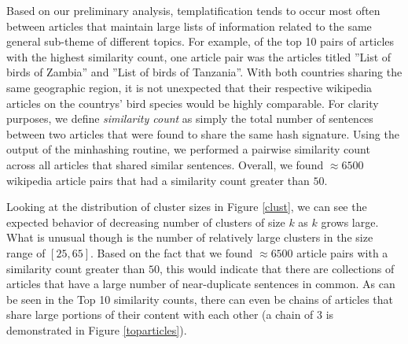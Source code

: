 \documentclass{acm_proc_article-sp}
\begin{document}
Based on our preliminary analysis, templatification tends to occur most often between articles that maintain large lists of information related to the same general sub-theme of different topics. For example, of the top 10 pairs of articles with the highest similarity count, one article pair was the articles titled ''List of birds of Zambia'' and ''List of birds of Tanzania''. With both countries sharing the same geographic region, it is not unexpected that their respective wikipedia articles on the countrys' bird species would be highly comparable. For clarity purposes, we define \emph{similarity count} as simply the total number of sentences between two articles that were found to share the same hash signature. Using the output of the minhashing routine, we performed a pairwise similarity count across all articles that shared similar sentences. Overall, we found $\approx 6500$ wikipedia article pairs that had a similarity count greater than $50$.

Looking at the distribution of cluster sizes in Figure \ref{clust}, we can see the expected behavior of decreasing number of clusters of size $k$ as $k$ grows large. What is unusual though is the number of relatively large clusters in the size range of $[25, 65]$. Based on the fact that we found $\approx 6500$ article pairs with a similarity count greater than $50$, this would indicate that there are collections of articles that have a large number of near-duplicate sentences in common. As can be seen in the Top 10 similarity counts, there can even be chains of articles that share large portions of their content with each other (a chain of 3 is demonstrated in Figure \ref{toparticles}).
\end{document}
